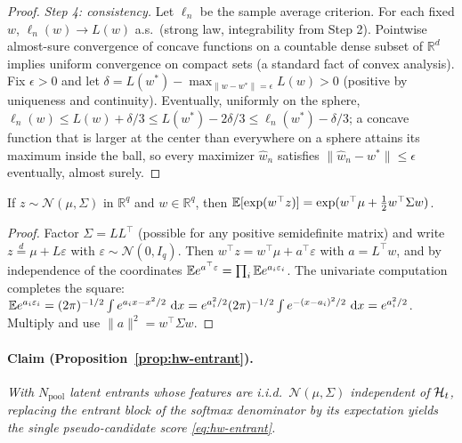 \begin{proof}
\emph{Step 4: consistency.} Let $\ell_n$ be the sample average criterion. For each fixed $w$,
$\ell_n(w) \to L(w)$ a.s.\ (strong law, integrability from Step 2). Pointwise almost-sure
convergence of concave functions on a countable dense subset of $\mathbb{R}^d$ implies uniform
convergence on compact sets (a standard fact of convex analysis). Fix $\epsilon > 0$ and let $\delta
= L(w^*) - \max_{\|w - w^*\| = \epsilon} L(w) > 0$ (positive by uniqueness and continuity).
Eventually, uniformly on the sphere, $\ell_n(w) \le L(w) + \delta/3 \le L(w^*) - 2\delta/3 \le
\ell_n(w^*) - \delta/3$; a concave function that is larger at the center than everywhere on a sphere
attains its maximum inside the ball, so every maximizer $\hat w_n$ satisfies $\|\hat w_n - w^*\| \le
\epsilon$ eventually, almost surely.
\end{proof}

\begin{lemma}
\label{lem:app-mgf}
If $z \sim \mathcal{N}(\mu, \Sigma)$ in $\mathbb{R}^q$ and $w \in \mathbb{R}^q$, then
$\mathbb{E}[\exp(w^\top z)] = \exp(w^\top \mu + \tfrac12 w^\top \Sigma w)$.
\end{lemma}

\begin{proof}
Factor $\Sigma = L L^\top$ (possible for any positive semidefinite matrix) and write $z
\stackrel{d}{=} \mu + L\varepsilon$ with $\varepsilon \sim \mathcal{N}(0, I_q)$. Then $w^\top z =
w^\top \mu + a^\top \varepsilon$ with $a = L^\top w$, and by independence of the coordinates $\mathbb{E}
e^{a^\top \varepsilon} = \prod_i \mathbb{E} e^{a_i \varepsilon_i}$. The univariate computation completes the
square: $\mathbb{E} e^{a_i \varepsilon_i} = (2\pi)^{-1/2} \int e^{a_i x - x^2/2}\, \,\mathrm{d} x = e^{a_i^2/2}
(2\pi)^{-1/2} \int e^{-(x - a_i)^2/2}\, \,\mathrm{d} x = e^{a_i^2/2}$. Multiply and use $\|a\|^2 = w^\top
\Sigma w$.
\end{proof}

\paragraph{Claim (Proposition~\ref{prop:hw-entrant}).}
\emph{With $N_{\mathrm{pool}}$ latent entrants whose features are i.i.d.\ $\mathcal{N}(\mu, \Sigma)$
independent of $\mathcal{H}_t$, replacing the entrant block of the softmax denominator by its expectation
yields the single pseudo-candidate score \eqref{eq:hw-entrant}.}


